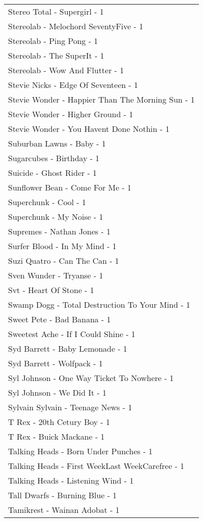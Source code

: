 \documentclass[
]{article}
\begin{document}
\begin{longtable}{l}
Stereo Total - Supergirl - 1 \\ 
Stereolab - Melochord SeventyFive - 1 \\ 
Stereolab - Ping Pong - 1 \\ 
Stereolab - The SuperIt - 1 \\ 
Stereolab - Wow And Flutter - 1 \\ 
Stevie Nicks - Edge Of Seventeen - 1 \\ 
Stevie Wonder - Happier Than The Morning Sun - 1 \\ 
Stevie Wonder - Higher Ground - 1 \\ 
Stevie Wonder - You Havent Done Nothin - 1 \\ 
Suburban Lawns - Baby - 1 \\ 
Sugarcubes - Birthday - 1 \\ 
Suicide - Ghost Rider - 1 \\ 
Sunflower Bean - Come For Me - 1 \\ 
Superchunk - Cool - 1 \\ 
Superchunk - My Noise - 1 \\ 
Supremes - Nathan Jones - 1 \\ 
Surfer Blood - In My Mind - 1 \\ 
Suzi Quatro - Can The Can - 1 \\ 
Sven Wunder - Tryanse - 1 \\ 
Svt - Heart Of Stone - 1 \\ 
Swamp Dogg - Total Destruction To Your Mind - 1 \\ 
Sweet Pete - Bad Banana - 1 \\ 
Sweetest Ache - If I Could Shine - 1 \\ 
Syd Barrett - Baby Lemonade - 1 \\ 
Syd Barrett - Wolfpack - 1 \\ 
Syl Johnson - One Way Ticket To Nowhere - 1 \\ 
Syl Johnson - We Did It - 1 \\ 
Sylvain Sylvain - Teenage News - 1 \\ 
T Rex - 20th Cetury Boy - 1 \\ 
T Rex - Buick Mackane - 1 \\ 
Talking Heads - Born Under Punches - 1 \\ 
Talking Heads - First WeekLast WeekCarefree - 1 \\ 
Talking Heads - Listening Wind - 1 \\ 
Tall Dwarfs - Burning Blue - 1 \\ 
Tamikrest - Wainan Adobat - 1 \\ 

\end{longtable}
\end{document}
